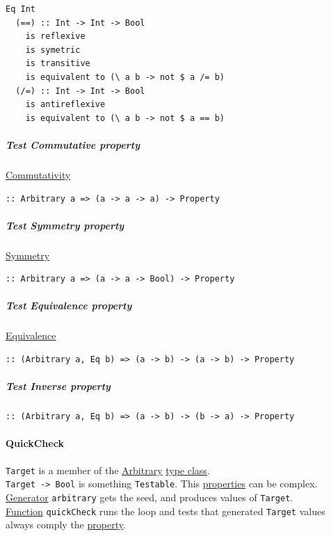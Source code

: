 \documentclass[11pt]{article}
\begin{document}
\begin{verbatim}
Eq Int
  (==) :: Int -> Int -> Bool
    is reflexive
    is symetric
    is transitive
    is equivalent to (\ a b -> not $ a /= b)
  (/=) :: Int -> Int -> Bool
    is antireflexive
    is equivalent to (\ a b -> not $ a == b)
\end{verbatim}

\subparagraph{\label{orgf66c8e0}Test Commutative property}
\label{sec:org24a6157}
\hyperref[orgcdabb90]{Commutativity}\\
\begin{verbatim}
:: Arbitrary a => (a -> a -> a) -> Property
\end{verbatim}

\subparagraph{\label{org2191426}Test Symmetry property}
\label{sec:org0de9127}
\hyperref[org85442a8]{Symmetry}\\
\begin{verbatim}
:: Arbitrary a => (a -> a -> Bool) -> Property
\end{verbatim}

\subparagraph{\label{org1b63575}Test Equivalence property}
\label{sec:orgf2f014f}
\hyperref[orgad1fc87]{Equivalence}\\
\begin{verbatim}
:: (Arbitrary a, Eq b) => (a -> b) -> (a -> b) -> Property
\end{verbatim}

\subparagraph{\label{org784c149}Test Inverse property}
\label{sec:org31d757e}
\begin{verbatim}
:: (Arbitrary a, Eq b) => (a -> b) -> (b -> a) -> Property
\end{verbatim}

\paragraph{\label{org85396c2}QuickCheck}
\label{sec:orgb270948}
\texttt{Target} is a member of the \hyperref[orgbfdf9b7]{Arbitrary} \hyperref[orga4a5066]{type class}.\\
\texttt{Target -> Bool} is something \texttt{Testable}. This \hyperref[org763ad6b]{properties} can be complex.\\
\hyperref[org7808460]{Generator} \texttt{arbitrary} gets the seed, and produces values of \texttt{Target}.\\
\hyperref[orgeb5cddb]{Function} \texttt{quickCheck} runs the loop and tests that generated \texttt{Target} values always comply the \hyperref[org07ca26b]{property}.\\
\end{document}
